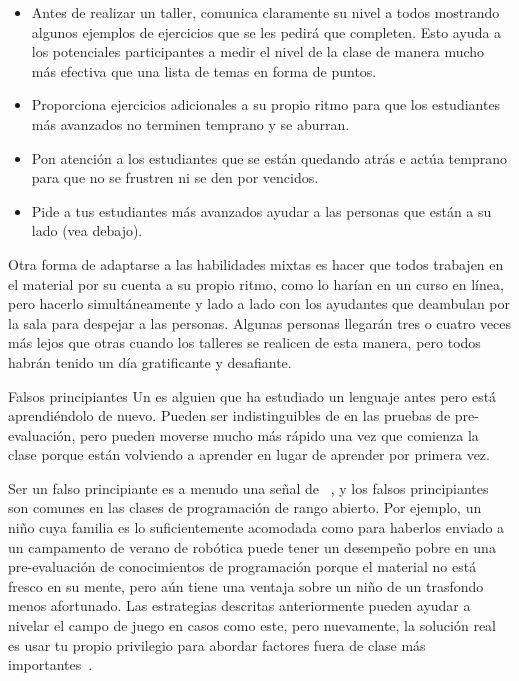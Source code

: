 \begin{itemize}

\item
  Antes de realizar un taller,
  comunica claramente su nivel a todos mostrando algunos ejemplos de ejercicios que se les pedirá que completen.
  Esto ayuda a los potenciales participantes a medir el nivel de la clase
  de manera mucho más efectiva que una lista de temas en forma de puntos.
 
\item
  Proporciona ejercicios adicionales a su propio ritmo
  para que los estudiantes más avanzados no terminen temprano y se aburran.

\item
  Pon atención a los estudiantes que se están quedando atrás
  e actúa temprano para que no se frustren ni se den por vencidos.

\item
  Pide a tus estudiantes más avanzados ayudar a las personas que están a su lado
  (vea  debajo).

\end{itemize}

Otra forma de adaptarse a las habilidades mixtas es
hacer que todos trabajen en el material por su cuenta a su propio ritmo,
como lo harían en un curso en línea,
pero hacerlo simultáneamente y lado a lado
con los ayudantes que deambulan por la sala para despejar a las personas.
Algunas personas llegarán tres o cuatro veces más lejos que otras cuando los talleres se realicen de esta manera,
pero todos habrán tenido un día gratificante y desafiante.

\begin{aside}{Falsos principiantes}
  Un  es alguien
  que ha estudiado un lenguaje antes pero está aprendiéndolo de nuevo.
  Pueden ser indistinguibles de 
  en las pruebas de pre-evaluación,
  pero pueden moverse mucho más rápido una vez que comienza la clase
  porque están volviendo a aprender en lugar de aprender por primera vez.
 
  Ser un falso principiante es a menudo una señal de ~\cite{Marg2010},
  y los falsos principiantes son comunes en las clases de programación de rango abierto.
  Por ejemplo,
  un niño cuya familia es lo suficientemente acomodada como para haberlos enviado a un campamento de verano de robótica
  puede tener un desempeño pobre en una pre-evaluación de conocimientos de programación
  porque el material no está fresco en su mente,
  pero aún tiene una ventaja sobre un niño de un trasfondo menos afortunado.
  Las estrategias descritas anteriormente pueden ayudar a nivelar el campo de juego en casos como este,
  pero nuevamente, la solución real es usar tu propio privilegio
  para abordar factores fuera de clase más importantes~\cite{Part2011}.
\end{aside}

